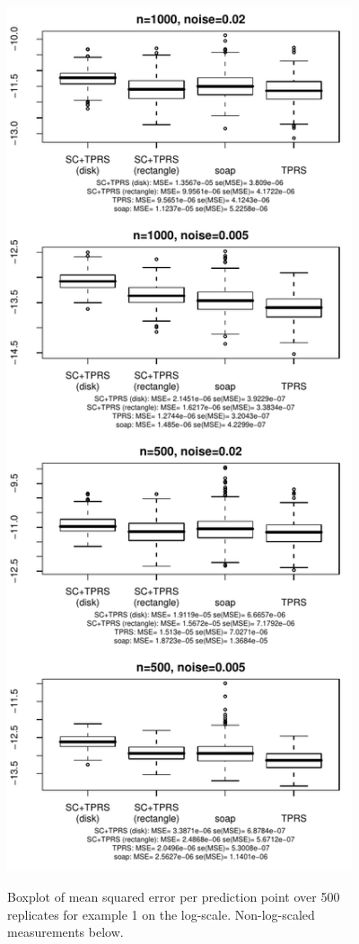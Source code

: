 \documentclass[a4paper,10pt]{amsart}
\begin{document}
\begin{figure}[p]
\centering
\includegraphics[width=4in]{figs-otherdomains/fig9-boxplot.pdf} \\
\caption{Boxplot of mean squared error per prediction point over 500 replicates for example 1 on the log-scale. Non-log-scaled measurements below.}
\label{fig9-boxplots}
\end{figure}
\end{document}
